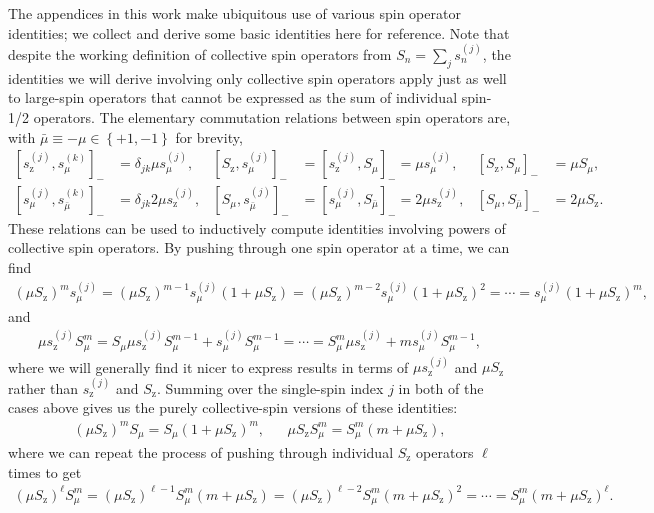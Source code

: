 \documentclass[pra,reprint,longbibliography]{revtex4-1}
\newcommand{\p}[1]{\left(#1\right)} %
\renewcommand{\sp}[1]{\left[#1\right]} %
\renewcommand{\set}[1]{\left\{#1\right\}} %
\newcommand{\z}{\text{z}}
\newcommand{\bmu}{{\bar\mu}}
\newcommand{\1}{\mathds{1}}
\begin{document}
The appendices in this work make ubiquitous use of various spin
operator identities; we collect and derive some basic identities here
for reference.  Note that despite the working definition of collective
spin operators from $S_n=\sum_js_n^{(j)}$, the identities we will
derive involving only collective spin operators apply just as well to
large-spin operators that cannot be expressed as the sum of individual
spin-1/2 operators.  The elementary commutation relations between spin
operators are, with $\bmu\equiv-\mu\in\set{+1,-1}$ for brevity,
\begin{align}
  \sp{s_\z^{(j)},s_\mu^{(k)}}_-
  &= \delta_{jk} \mu s_\mu^{(j)},
  &
  \sp{S_\z,s_\mu^{(j)}}_-
  &= \sp{s_\z^{(j)},S_\mu}_- = \mu s_\mu^{(j)},
  &
  \sp{S_\z,S_\mu}_-
  &= \mu S_\mu,
  \label{eq:comm_z_base} \\
  \sp{s_\mu^{(j)},s_\bmu^{(k)}}_-
  &= \delta_{jk} 2 \mu s_\z^{(j)},
  &
  \sp{S_\mu,s_\bmu^{(j)}}_-
  &= \sp{s_\mu^{(j)},S_\bmu}_- = 2 \mu s_\z^{(j)},
  &
  \sp{S_\mu,S_\bmu}_-
  &= 2 \mu S_\z.
  \label{eq:comm_mu_base}
\end{align}
These relations can be used to inductively compute identities
involving powers of collective spin operators.  By pushing through one
spin operator at a time, we can find
\begin{align}
  \p{\mu S_\z}^m s_\mu^{(j)}
  = \p{\mu S_\z}^{m-1} s_\mu^{(j)} \p{1 + \mu S_\z}
  = \p{\mu S_\z}^{m-2} s_\mu^{(j)} \p{1 + \mu S_\z}^2
  = \cdots
  = s_\mu^{(j)} \p{1 + \mu S_\z}^m,
  \label{eq:push_z_mu_Ss}
\end{align}
and
\begin{align}
  \mu s_\z^{(j)} S_\mu^m
  = S_\mu \mu s_\z^{(j)} S_\mu^{m-1} + s_\mu^{(j)} S_\mu^{m-1}
  = \cdots
  = S_\mu^m \mu s_\z^{(j)} + ms_\mu^{(j)} S_\mu^{m-1},
  \label{eq:push_z_mu_sS}
\end{align}
where we will generally find it nicer to express results in terms of
$\mu s_\z^{(j)}$ and $\mu S_\z$ rather than $s_\z^{(j)}$ and $S_\z$.
Summing over the single-spin index $j$ in both of the cases above
gives us the purely collective-spin versions of these identities:
\begin{align}
  \p{\mu S_\z}^m S_\mu = S_\mu \p{1 + \mu S_\z}^m,
  &&
  \mu S_\z S_\mu^m = S_\mu^m \p{m + \mu S_\z},
  \label{eq:push_z_mu_single}
\end{align}
where we can repeat the process of pushing through individual $S_\z$
operators $\ell$ times to get
\begin{align}
  \p{\mu S_\z}^\ell S_\mu^m
  = \p{\mu S_\z}^{\ell-1} S_\mu^m \p{m + \mu S_\z}
  = \p{\mu S_\z}^{\ell-2} S_\mu^m \p{m + \mu S_\z}^2
  = \cdots
  = S_\mu^m \p{m + \mu S_\z}^\ell.
  \label{eq:push_z_mu}
\end{align}
\end{document}
